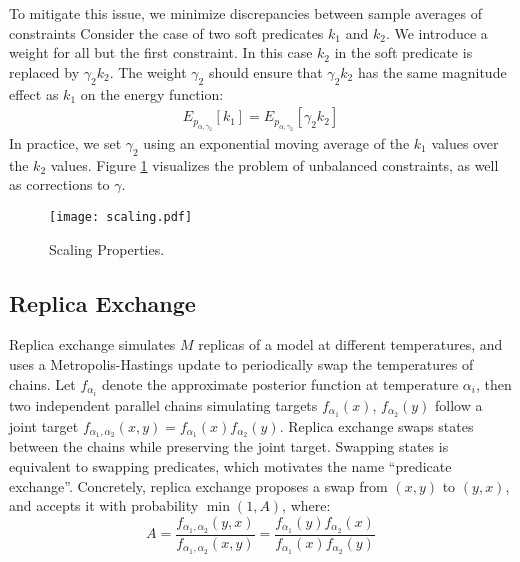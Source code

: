 To mitigate this issue, we minimize discrepancies between sample averages of constraints
Consider the case of two 
soft predicates $k_1$ and $k_2$. We introduce a weight for all but the first constraint.
In this case $k_2$ in the soft predicate is replaced
by $\gamma_2 k_2$. The weight $\gamma_2$ should
ensure that $\gamma_2 k_2$ has the same
magnitude effect as $k_1$ on the energy
function:
\begin{align*}
E_{p_{\alpha, \gamma_2}}[k_1] = E_{p_{\alpha, \gamma_2}}[\gamma_2 k_2] 
\end{align*}
In practice, we set $\gamma_2$ using an exponential moving
average of the $k_1$ values over the $k_2$ values.
Figure \ref{scaling} visualizes the problem of unbalanced constraints, as well as corrections to $\gamma$.


\begin{figure}
  \centering
  \texttt{[image: scaling.pdf]}
  \caption{Scaling Properties.}\label{scaling}
  \end{figure}

  
\subsection{Replica Exchange}\label{replicaexchange}
Replica exchange \citep{swendsen1986replica} simulates $M$ replicas of a model at different temperatures, and uses a Metropolis-Hastings update to  periodically swap the temperatures of chains.
Let $f_{\alpha_i}$ denote the approximate posterior function at temperature $\alpha_i$, then two independent parallel chains simulating targets $f_{\alpha_1}(x)$, $f_{\alpha_2}(y)$  follow a joint target $f_{\alpha_1, \alpha_2}(x,y) = f_{\alpha_1}(x)f_{\alpha_2}(y)$.
Replica exchange swaps states between the chains while preserving the joint target.
Swapping states is equivalent to swapping predicates, which motivates the name ``predicate exchange''.
Concretely, replica exchange proposes a swap from $(x, y)$ to $(y, x)$, and accepts it with probability $\min(1, A)$, where:
\begin{equation}
A =  \frac{f_{\alpha_1, \alpha_2}(y,x)}{f_{\alpha_1, \alpha_2}(x,y)} = \frac{f_{\alpha_1}(y)f_{\alpha_2}(x)}{f_{\alpha_1}(x)f_{\alpha_2}(y)}
\end{equation}

